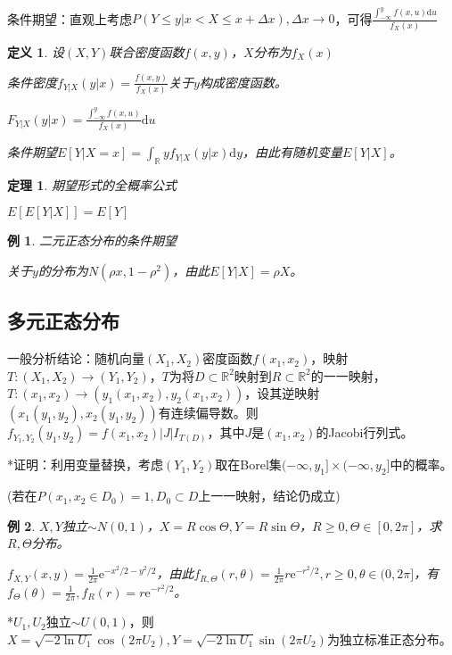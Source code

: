 \documentclass[a4paper,UTF8,fontset=windows]{ctexart}
\newtheorem{thm}{定理}[section]
\newtheorem{exmp}{例}[section]
\newtheorem{defi}{定义}[section]
\begin{document}
~

条件期望：直观上考虑$P(Y\le y|x<X\le x+\Delta x),\Delta x\to0$，可得$\frac{\int_{-\infty}^yf(x,u)\mathrm{d}u}{f_X(x)}$

\begin{defi} 设$(X,Y)$联合密度函数$f(x,y)$，$X$分布为$f_X(x)$

条件密度$f_{Y|X}(y|x)=\frac{f(x,y)}{f_X(x)}$关于$y$构成密度函数。

$F_{Y|X}(y|x)=\frac{\int_{-\infty}^yf(x,u)}{f_X(x)}\mathrm{d}u$

条件期望$E[Y|X=x]=\int_{\mathbb{R}}yf_{Y|X}(y|x)\mathrm{d}y$，由此有随机变量$E[Y|X]$。
\end{defi}

\begin{thm} 期望形式的全概率公式

$E[E[Y|X]]=E[Y]$
\end{thm}

\begin{exmp} 二元正态分布的条件期望

关于$y$的分布为$N(\rho x,1-\rho^2)$，由此$E[Y|X]=\rho X$。
\end{exmp}

\subsection{多元正态分布}
一般分析结论：随机向量$(X_1,X_2)$密度函数$f(x_1,x_2)$，映射$T:(X_1,X_2)\to(Y_1,Y_2)$，$T$为将$D\subset\mathbb{R}^2$映射到$R\subset\mathbb{R}^2$的一一映射，$T:(x_1,x_2)\to(y_1(x_1,x_2),y_2(x_1,x_2))$，设其逆映射$(x_1(y_1,y_2),x_2(y_1,y_2))$有连续偏导数。则$f_{Y_1,Y_2}(y_1,y_2)=f(x_1,x_2)|J|I_{T(D)}$，其中$J$是$(x_1,x_2)$的Jacobi行列式。

*证明：利用变量替换，考虑$(Y_1,Y_2)$取在Borel集$(-\infty,y_1]\times(-\infty,y_2]$中的概率。

(若在$P(x_1,x_2\in D_0)=1,D_0\subset D$上一一映射，结论仍成立)

\begin{exmp} $X,Y$独立$\sim N(0,1)$，$X=R\cos\Theta,Y=R\sin\Theta$，$R\ge0,\Theta\in[0,2\pi]$，求$R,\Theta$分布。

$f_{X,Y}(x,y)=\frac{1}{2\pi}\mathrm{e}^{-x^2/2-y^2/2}$，由此$f_{R,\Theta}(r,\theta)=\frac{1}{2\pi}r\mathrm{e}^{-r^2/2},r\ge0,\theta\in(0,2\pi]$，有$f_\Theta(\theta)=\frac{1}{2\pi},f_R(r)=r\mathrm{e}^{-r^2/2}$。
\end{exmp}

*$U_1,U_2$独立$\sim U(0,1)$，则$X=\sqrt{-2\ln{U_1}}\cos(2\pi U_2),Y=\sqrt{-2\ln{U_1}}\sin(2\pi U_2)$为独立标准正态分布。
\end{document}
